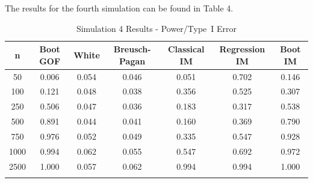 \documentclass[sn-mathphys-ay]{sn-jnl}
\begin{document}
The results for the fourth simulation can be found in Table 4.


\begin{table}[h]
\caption{Simulation 4 Results - Power/Type~I Error}\label{sim4tab}%
\begin{tabular}{ c|c|c|c|c|c|c}
\toprule
n & Boot GOF & White & Breusch-Pagan & Classical IM & Regression IM & Boot IM \\
\midrule
50 & 0.006 & 0.054 & 0.046 & 0.051 & 0.702 & 0.146 \\
100 & 0.121 & 0.048 & 0.038 & 0.356 & 0.525 & 0.307 \\
250 & 0.506 & 0.047 & 0.036 & 0.183 & 0.317 & 0.538 \\
500 & 0.891 & 0.044 & 0.041 & 0.160 & 0.369 & 0.790 \\
750 & 0.976 & 0.052 & 0.049 & 0.335 & 0.547 & 0.928 \\
1000 & 0.994 & 0.062 & 0.055 & 0.547 & 0.692 & 0.972 \\
2500 & 1.000 & 0.057 & 0.062 & 0.994 & 0.994 & 1.000 \\
\botrule
\end{tabular}

\end{table}
\end{document}
